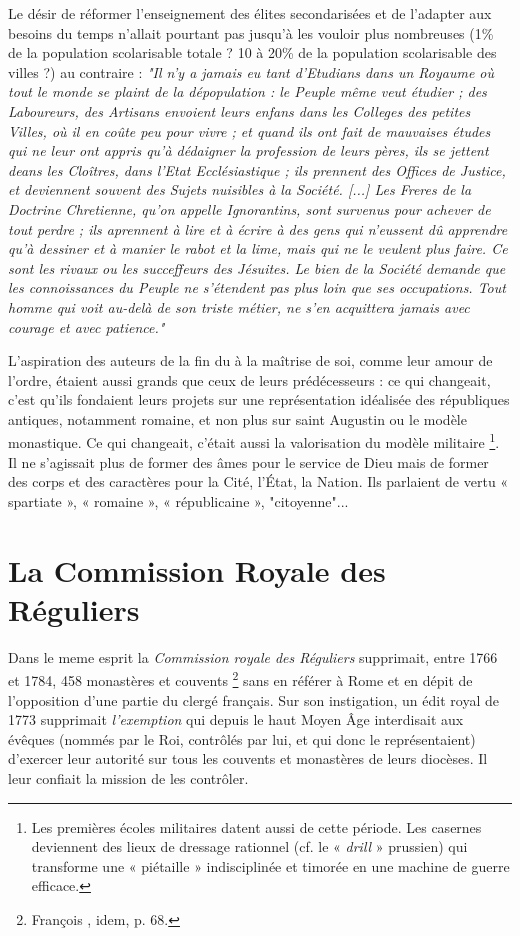 Le désir de réformer l'enseignement des élites secondarisées  et de l'adapter aux besoins du temps n'allait pourtant pas jusqu'à les vouloir plus nombreuses (1\% de la population scolarisable totale ? 10 à 20\% de la population scolarisable des villes ?) au contraire : \emph{"Il n'y a jamais eu tant d'Etudians dans un Royaume où tout le monde se plaint de la dépopulation : le Peuple même veut étudier ; des Laboureurs, des Artisans envoient leurs enfans dans les Colleges des petites Villes, où il en coûte peu pour vivre ; et quand ils ont fait de mauvaises études qui ne leur ont appris qu'à dédaigner la profession de leurs pères, ils se jettent deans les Cloîtres, dans l'Etat Ecclésiastique ; ils prennent des Offices de Justice, et deviennent souvent des Sujets nuisibles à la Société. [...] Les Freres de la Doctrine Chretienne, qu'on appelle Ignorantins, sont survenus pour achever de tout perdre ; ils aprennent à lire et à écrire à des gens qui n'eussent dû apprendre qu'à dessiner et à manier le rabot et la lime, mais qui ne le veulent plus faire. Ce sont les rivaux ou les succeffeurs des Jésuites. Le bien de la Société demande que les connoissances du Peuple ne s'étendent pas plus loin que ses occupations. Tout homme qui voit au-delà de son triste métier, ne s'en acquittera jamais avec courage et avec patience."}


 L'aspiration des auteurs de la fin du  à la maîtrise de soi, comme leur amour de l'ordre, étaient aussi grands que ceux de leurs prédécesseurs : ce qui changeait, c'est qu'ils fondaient leurs projets sur une représentation idéalisée des républiques antiques, notamment romaine, et non plus sur saint Augustin ou le modèle monastique. Ce qui changeait, c'était aussi la valorisation du modèle militaire%
\footnote{Les premières écoles militaires datent aussi de cette période. Les casernes deviennent des lieux de dressage rationnel (cf. le « \emph{drill} » prussien) qui transforme une « piétaille » indisciplinée et timorée en une machine de guerre efficace.}. Il ne s'agissait plus de former des âmes pour le service de Dieu mais de former des corps et des caractères pour la Cité, l'État, la Nation. Ils parlaient de vertu « spartiate », « romaine », « républicaine », "citoyenne"...


\section{La Commission Royale des Réguliers}


 Dans le meme esprit la \emph{Commission royale des Réguliers} supprimait, entre 1766 et 1784, 458 monastères et couvents%
\footnote{François , idem, p. 68.} 
sans en référer à Rome et en dépit de l'opposition d'une partie du clergé français. Sur son instigation, un édit royal de 1773 supprimait \emph{l'exemption} qui depuis le haut Moyen Âge interdisait aux évêques (nommés par le Roi, contrôlés par lui, et qui donc le représentaient) d'exercer leur autorité sur tous les couvents et monastères de leurs diocèses. Il leur confiait la mission de les contrôler. 

